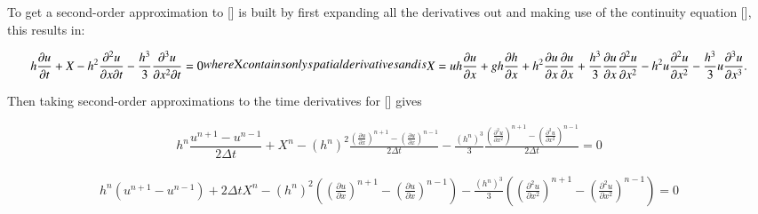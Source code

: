\documentclass[SingleSpace,12pt,Proceedings]{Serre_ASCE}
\begin{document}
To get a second-order approximation to [] is built by first expanding all the derivatives out and making use of the continuity equation [], this results in:
\begin{linenomath*}
\begin{subequations}
\begin{gather}
h\dfrac{\partial u}{\partial t} + X - h^2\frac{\partial^2 u}{\partial x \partial t} - \frac{h^3}{3}\frac{\partial^3 u}{\partial x^2 \partial t}  =0 
\label{eq:expandedu}
\end{gather}
where $X$ contains only spatial derivatives and is
\begin{gather}
X = uh\frac{\partial u}{\partial x} + gh\frac{\partial h}{\partial x} + h^2\frac{\partial u}{\partial x}\frac{\partial u}{\partial x} + \frac{h^3}{3}\frac{\partial u}{\partial x}\frac{\partial^2 u}{\partial x^2} - h^2u\frac{\partial^2 u}{\partial x^2}- \frac{h^3}{3}u\frac{\partial^3 u}{\partial x^3} .
\end{gather}
\end{subequations}
\end{linenomath*}
Then taking second-order approximations to the time derivatives for [] gives
\begin{linenomath*}
\begin{gather}
h^{n}\dfrac{u^{n+1} - u^{n-1}}{2 \Delta t} + X^{n} - \left(h^{n}\right)^2\frac{ \left(\frac{\partial u}{\partial x}\right)^{n+1} - \left(\frac{\partial u}{\partial x}\right)^{n-1} }{2 \Delta t} - \frac{\left(h^{n}\right)^3}{3}\frac{ \left(\frac{\partial^2 u}{\partial x^2}\right)^{n+1} - \left(\frac{\partial^2 u}{\partial x^2}\right)^{n-1} }{2 \Delta t}  =0 
\label{eq:expandedutdisc}
\end{gather}
\end{linenomath*}
\begin{linenomath*}
\begin{gather}
h^{n} \left(u^{n+1} - u^{n-1}\right) + 2\Delta tX^{n} - \left(h^{n}\right)^2 \left(\left(\frac{\partial u}{\partial x}\right)^{n+1} - \left(\frac{\partial u}{\partial x}\right)^{n-1}\right) - \frac{\left(h^{n}\right)^3}{3}\left(\left(\frac{\partial^2 u}{\partial x^2}\right)^{n+1} - \left(\frac{\partial^2 u}{\partial x^2}\right)^{n-1} \right)  =0 
\label{eq:expandedutdisc1}
\end{gather}
\end{linenomath*}
\end{document}
